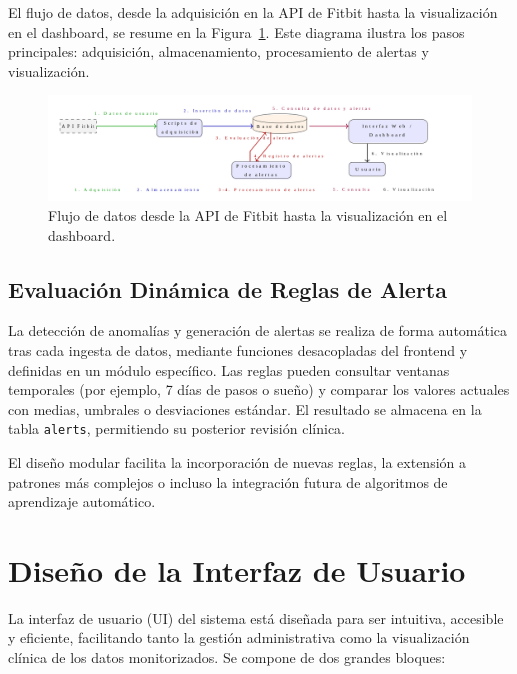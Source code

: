 El flujo de datos, desde la adquisición en la API de Fitbit hasta la visualización en el dashboard, se resume en la Figura~\ref{fig:flujo_datos}. Este diagrama ilustra los pasos principales: adquisición, almacenamiento, procesamiento de alertas y visualización.

\begin{figure}[htbp]
    \centering
    \includegraphics[width=1\textwidth, height=0.3\textheight]{imagenes/flujo_datos.png}
    \caption{Flujo de datos desde la API de Fitbit hasta la visualización en el dashboard.}
    \label{fig:flujo_datos}
\end{figure}

\subsection{Evaluación Dinámica de Reglas de Alerta}
La detección de anomalías y generación de alertas se realiza de forma automática tras cada ingesta de datos, mediante funciones desacopladas del frontend y definidas en un módulo específico. Las reglas pueden consultar ventanas temporales (por ejemplo, 7 días de pasos o sueño) y comparar los valores actuales con medias, umbrales o desviaciones estándar. El resultado se almacena en la tabla \texttt{alerts}, permitiendo su posterior revisión clínica.

El diseño modular facilita la incorporación de nuevas reglas, la extensión a patrones más complejos o incluso la integración futura de algoritmos de aprendizaje automático.

\section{Diseño de la Interfaz de Usuario}
\label{sec:diseno_ui}

La interfaz de usuario (UI) del sistema está diseñada para ser intuitiva, accesible y eficiente, facilitando tanto la gestión administrativa como la visualización clínica de los datos monitorizados. Se compone de dos grandes bloques:

